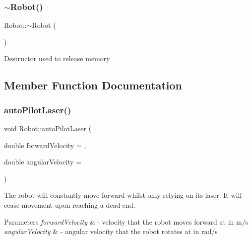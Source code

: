 \subsubsection{\texorpdfstring{$\sim$\+Robot()}{~Robot()}}
{\footnotesize\ttfamily Robot\+::$\sim$\+Robot (\begin{DoxyParamCaption}{ }\end{DoxyParamCaption})}

Destructor used to release memory 

\subsection{Member Function Documentation}
\mbox{\label{classRobot_a265b1714581af33680485d17bb496526}} 
\subsubsection{\texorpdfstring{auto\+Pilot\+Laser()}{autoPilotLaser()}}
{\footnotesize\ttfamily void Robot\+::auto\+Pilot\+Laser (\begin{DoxyParamCaption}\item[{double}]{forward\+Velocity = {},  }\item[{double}]{angular\+Velocity = {} }\end{DoxyParamCaption})}

The robot will constantly move forward whilst only relying on its laser. It will cease movement upon reaching a dead end.


\begin{DoxyParams}{Parameters}
{\em forward\+Velocity} & -\/ velocity that the robot moves forward at in m/s \\
\hline
{\em angular\+Velocity} & -\/ angular velocity that the robot rotates at in rad/s \\
\hline
\end{DoxyParams}
\mbox{\label{classRobot_acc190d23229cf677bd5067eb9258d5ed}} 
